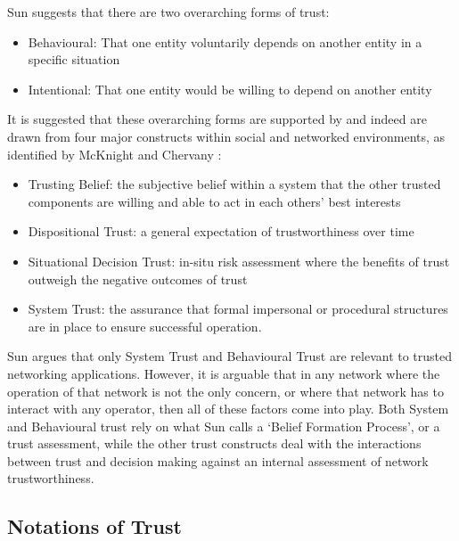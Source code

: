 Sun\cite{Sun2008} suggests that there are two overarching forms of trust:
\begin{itemize}
  \item Behavioural: That one entity voluntarily depends on another entity in a specific situation
  \item Intentional: That one entity would be willing to depend on another entity
\end{itemize}

It is suggested that these overarching forms are supported by and indeed are drawn from four major constructs within social and networked environments, as identified by McKnight and Chervany \cite{Mcknight1996}:

\begin{itemize}
  \item Trusting Belief: the subjective belief within a system that the other trusted components are willing and able to act in each others’ best interests
  \item Dispositional Trust: a general expectation of trustworthiness over time 
  \item Situational Decision Trust: in-situ risk assessment where the benefits of trust outweigh the negative outcomes of trust
  \item System Trust: the assurance that formal impersonal or procedural structures are in place to ensure successful operation.
\end{itemize}

Sun argues that only System Trust and Behavioural Trust are relevant to trusted networking applications.
However, it is arguable that in any network where the operation of that network is not the only concern, or where that network has to interact with any operator, then all of these factors come into play.
Both System and Behavioural trust rely on what Sun calls a ‘Belief Formation Process’, or a trust assessment, while the other trust constructs deal with the interactions between trust and decision making against an internal assessment of network trustworthiness.

\subsection{Notations of Trust}


